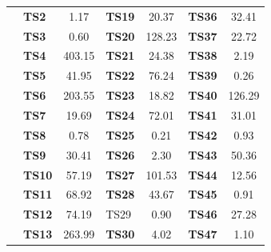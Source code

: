 \begin{table}[]
{\begin{tabular}{|l|l|S[table-format=3.2]|l|S[table-format=3.2]|l|S[table-format=3.2]|}
		& \textbf{TS2}       & 1.17                            & \textbf{TS19}      & 20.37                          & \textbf{TS36}      & 32.41                          \\  
		& \textbf{TS3}       & 0.60                            & \textbf{TS20}      & 128.23                         & \textbf{TS37}      & 22.72                          \\  
		& \textbf{TS4}       & 403.15  & \textbf{TS21}      & 24.38                          & \textbf{TS38}      & 2.19                           \\  
		& \textbf{TS5}       & 41.95                           & \textbf{TS22}      & 76.24                          & \textbf{TS39}      & 0.26                           \\  
		& \textbf{TS6}       & 203.55                          & \textbf{TS23}      & 18.82                          & \textbf{TS40}      & 126.29                         \\  
		& \textbf{TS7}       & 19.69                           & \textbf{TS24}      & 72.01                          & \textbf{TS41}      & 31.01                          \\  
		& \textbf{TS8}       & 0.78                            & \textbf{TS25}      & 0.21                           & \textbf{TS42}      & 0.93                           \\  
		& \textbf{TS9}       & 30.41                           & \textbf{TS26}      & 2.30                           & \textbf{TS43}      & 50.36                          \\  
		& \textbf{TS10}      & 57.19                           & \textbf{TS27}      & 101.53                         & \textbf{TS44}      & 12.56                          \\  
		& \textbf{TS11}      & 68.92                           & \textbf{TS28}      & 43.67                          & \textbf{TS45}      & 0.91                           \\  
		& \textbf{TS12}      & 74.19                           & TS29               & 0.90                           & \textbf{TS46}      & 27.28                          \\  
		& \textbf{TS13}      & 263.99                          & \textbf{TS30}      & 4.02                           & \textbf{TS47}      & 1.10                           \\  

\end{tabular}}
\end{table}
